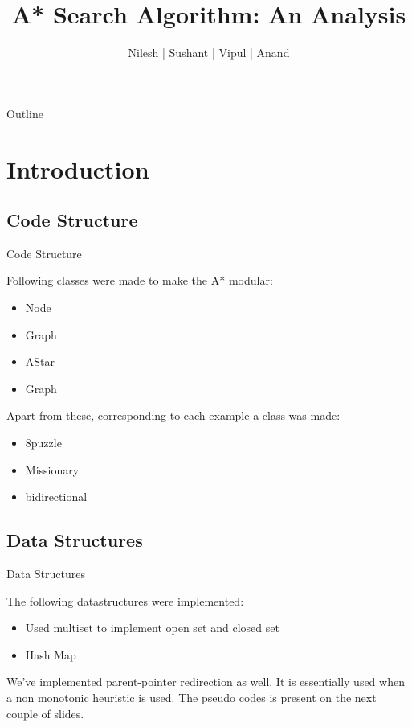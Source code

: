 \documentclass{beamer}
\title[AI Lab Report]{A* Search Algorithm: An Analysis}
\author{Nilesh | Sushant | Vipul | Anand}
\institute{Indian Institute of Technology, Bombay}
\begin{document}
\begin{frame}
  \titlepage
\end{frame}

\begin{frame}{Outline}
  \tableofcontents
\end{frame}

\section{Introduction}

\subsection{Code Structure}
\begin{frame}{Code Structure}

Following classes were made to make the A* modular:
\begin{itemize}
  \item Node
  \item Graph
  \item AStar
  \item Graph
\end{itemize}
Apart from these, corresponding to each example a class was made:
\begin{itemize}
  \item 8puzzle
  \item Missionary
  \item bidirectional

\end{itemize}
\end{frame}

\subsection{Data Structures}

\begin{frame}{Data Structures}

The following datastructures were implemented:
\begin{itemize}
\item Used multiset to implement open set and closed set
\item Hash Map
\end{itemize}

We've implemented parent-pointer redirection as well.
It is essentially used when a non monotonic heuristic is used.
The pseudo codes is present on the next couple of slides.
\end{frame}
\end{document}
